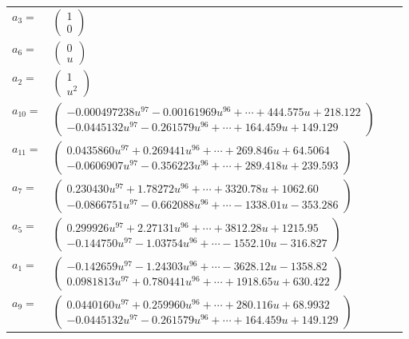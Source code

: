 \documentclass[1p]{elsarticle_modified}
\theoremstyle{definition}
\begin{document}
\begin{tabular}{m{7pt} m{180pt} m{7pt} m{180pt} }
\flushright $a_{3}=$&$\begin{pmatrix}1\\0\end{pmatrix}$ \\
\flushright $a_{6}=$&$\begin{pmatrix}0\\u\end{pmatrix}$ \\
\flushright $a_{2}=$&$\begin{pmatrix}1\\u^2\end{pmatrix}$ \\
\flushright $a_{10}=$&$\begin{pmatrix}-0.000497238 u^{97}-0.00161969 u^{96}+\cdots+444.575 u+218.122\\-0.0445132 u^{97}-0.261579 u^{96}+\cdots+164.459 u+149.129\end{pmatrix}$ \\
\flushright $a_{11}=$&$\begin{pmatrix}0.0435860 u^{97}+0.269441 u^{96}+\cdots+269.846 u+64.5064\\-0.0606907 u^{97}-0.356223 u^{96}+\cdots+289.418 u+239.593\end{pmatrix}$ \\
\flushright $a_{7}=$&$\begin{pmatrix}0.230430 u^{97}+1.78272 u^{96}+\cdots+3320.78 u+1062.60\\-0.0866751 u^{97}-0.662088 u^{96}+\cdots-1338.01 u-353.286\end{pmatrix}$ \\
\flushright $a_{5}=$&$\begin{pmatrix}0.299926 u^{97}+2.27131 u^{96}+\cdots+3812.28 u+1215.95\\-0.144750 u^{97}-1.03754 u^{96}+\cdots-1552.10 u-316.827\end{pmatrix}$ \\
\flushright $a_{1}=$&$\begin{pmatrix}-0.142659 u^{97}-1.24303 u^{96}+\cdots-3628.12 u-1358.82\\0.0981813 u^{97}+0.780441 u^{96}+\cdots+1918.65 u+630.422\end{pmatrix}$ \\
\flushright $a_{9}=$&$\begin{pmatrix}0.0440160 u^{97}+0.259960 u^{96}+\cdots+280.116 u+68.9932\\-0.0445132 u^{97}-0.261579 u^{96}+\cdots+164.459 u+149.129\end{pmatrix}$ \\

\end{tabular}
\end{document}
